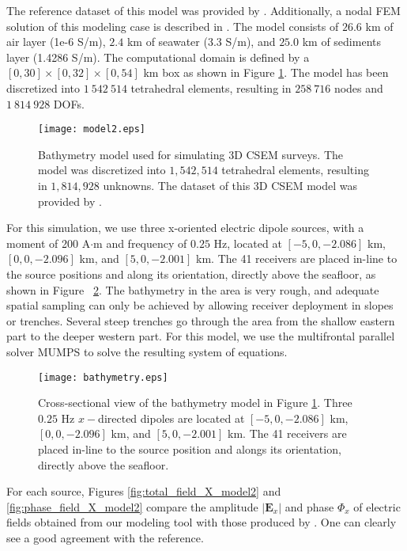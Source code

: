 \documentclass[review]{elsarticle}
\begin{document}
The reference dataset of this model was provided by \citet{Chung2014}. Additionally, a nodal FEM solution of this modeling case is described in \citet{Um2013}. The model consists of $26.6$ km of air layer (1e-6 S/m), $2.4$ km of seawater (3.3 S/m), and $25.0$ km of sediments layer (1.4286 S/m). The computational domain is defined by a $[0,30]\times[0,32]\times[0,54]$ km box as shown in Figure \ref{fig:model2}. The model has been discretized into $1\:542\:514$ tetrahedral elements, resulting in $258\:716$ nodes and $1\:814\:928$ DOFs.
\begin{figure}[!htbp]
\centering
\texttt{[image: model2.eps]}
\caption{Bathymetry model used for simulating 3D CSEM surveys. The model was discretized into $1,542,514$ tetrahedral elements, resulting in $1,814,928$ unknowns. The dataset of this 3D CSEM model was provided by \citet{Chung2014}.}
\label{fig:model2}
\end{figure}
For this simulation, we use three x-oriented electric dipole sources, with a moment of 200 A$\cdot$m and frequency of $0.25$ Hz, located at $[-5, 0, -2.086]$ km, $[0, 0, -2.096]$ km, and $[5, 0, -2.001]$ km. The 41 receivers are placed in-line to the source positions and along its orientation, directly above the seafloor, as shown in Figure ~\ref{fig:bathymetry}. The bathymetry in the area is very rough, and adequate spatial sampling can only be achieved by allowing receiver deployment in slopes or trenches. Several steep trenches go through the area from the shallow eastern part to the deeper western part. For this model, we use the multifrontal parallel solver MUMPS \citep{MUMPS2006} to solve the resulting system of equations.
\begin{figure}[!htbp]
\centering
\texttt{[image: bathymetry.eps]}
\caption{Cross-sectional view of the bathymetry model in Figure \ref{fig:model2}. Three $0.25$ Hz $x-$directed dipoles are located at $[-5, 0, -2.086]$ km, $[0, 0, -2.096]$ km, and $[5, 0, -2.001]$ km. The 41 receivers are placed in-line to the source position and alongs its orientation, directly above the seafloor.}
\label{fig:bathymetry}
\end{figure}
For each source, Figures \ref{fig:total_field_X_model2} and \ref{fig:phase_field_X_model2} compare the amplitude $|\mathbf{E}_{x}|$ and phase $\Phi_{x}$ of electric fields obtained from our modeling tool with those produced by \citet{Chung2014}. One can clearly see a good agreement with the reference.
\end{document}
